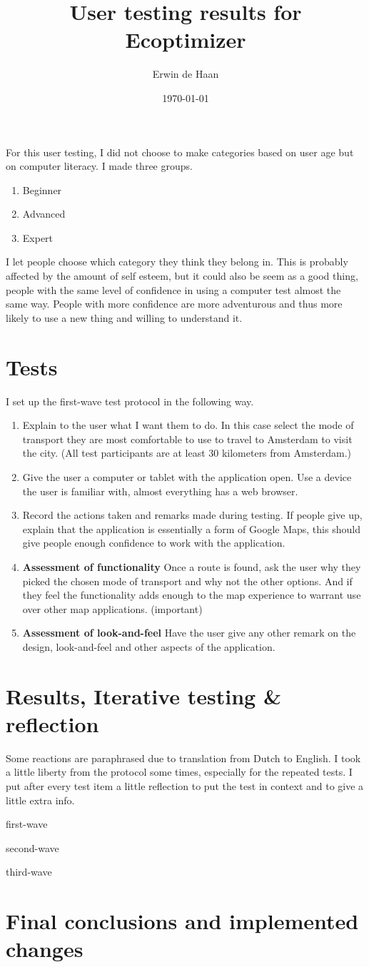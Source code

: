 \documentclass[final,a4paper,11pt]{article}
\author{Erwin de Haan}
\title{User testing results for Ecoptimizer}
\date{\today}
\begin{document}
\maketitle
For this user testing, I did not choose to make categories based on user age but on computer literacy. I made three groups.
\begin{enumerate}
\item Beginner
\item Advanced
\item Expert
\end{enumerate}
I let people choose which category they think they belong in. This is probably affected by the amount of self esteem, but it could also be seem as a good thing, people with the same level of confidence in using a computer test almost the same way. People with more confidence are more adventurous and thus more likely to use a new thing and willing to understand it.
\section*{Tests}
I set up the first-wave test protocol in the following way.
\begin{enumerate}
\item Explain to the user what I want them to do. In this case select the mode of transport they are most comfortable to use to travel to Amsterdam to visit the city. (All test participants are at least 30 kilometers from Amsterdam.)
\item Give the user a computer or tablet with the application open. Use a device the user is familiar with, almost everything has a web browser.
\item Record the actions taken and remarks made during testing. If people give up, explain that the application is essentially a form of Google Maps, this should give people enough confidence to work with the application.
\item \textbf{Assessment of functionality} Once a route is found, ask the user why they picked the chosen mode of transport and why not the other options. And if they feel the functionality adds enough to the map experience to warrant use over other map applications. (important)
\item \textbf{Assessment of look-and-feel} Have the user give any other remark on the design, look-and-feel and other aspects of the application.
\end{enumerate}
\section*{Results, Iterative testing \& reflection}
Some reactions are paraphrased due to translation from Dutch to English. I took a little liberty from the protocol some times, especially for the repeated tests. I put after every test item a little reflection to put the test in context and to give a little extra info.

{first-wave}

{second-wave}

{third-wave}

\section*{Final conclusions and implemented changes}
\end{document}
